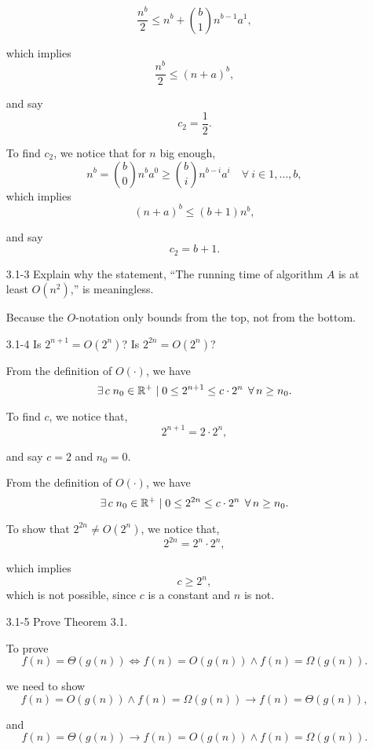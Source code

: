 \begin{enumerate}
\begin{framed}
\[
\frac{n^b}{2} \le n^b + \binom{b}{1} n^{b - 1} a^1,
\]

which implies
\[
\frac{n^b}{2} \le (n + a)^b,
\]

and say
\[
c_2 = \frac{1}{2}.
\]

To find \(c_2\), we notice that for $n$ big enough,
\[
n^b = \binom{b}{0} n^b a^0
\geq \binom{b}{i} n^{b - i} a^i \quad \forall\ i \in 1, \dots ,b,
\]
which implies
\[
(n + a)^b \leq (b + 1) n^b,
\]

and say
\[
c_2 = b + 1.
\]
\end{framed}

\item[3.1{-}3]{Explain why the statement, ``The running time of algorithm $A$ is
  at least $O(n^2)$,'' is meaningless.}

\begin{framed}
Because the $O$-notation only bounds from the top, not from the bottom.
\end{framed}

\item[3.1{-}4]{Is $2^{n+1} = O(2^n)$? Is $2^{2n} = O(2^n)$?}

\begin{framed}
From the definition of $O(\cdot)$, we have
\[
\operatorname{\exists} c\;n_0\in\mathbb{R}^+ \mid 0 \leq 2^{n+1} \leq c \cdot 2^n\;
\operatorname{\forall} n \ge n_0.
\]

To find $c$, we notice that,
\[
2^{n+1} = 2 \cdot 2^n,
\]

and say $c = 2$ and $n_0 = 0$.

From the definition of $O(\cdot)$, we have
\[
\operatorname{\exists} c\;n_0\in\mathbb{R}^+ \mid 0 \leq 2^{2n} \leq c \cdot 2^n\;
\operatorname{\forall} n \ge n_0.
\]

To show that $2^{2n} \neq O(2^n)$, we notice that,
\[
2^{2n} = 2^n \cdot 2^n,
\]

which implies
\[
c \ge 2^n,
\]
which is not possible, since $c$ is a constant and $n$ is not.
\end{framed}

\item[3.1{-}5]{Prove Theorem 3.1.}

\begin{framed}
To prove
\[
f(n) = \Theta(g(n)) \iff f(n) = O(g(n)) \wedge f(n) = \Omega(g(n)).
\]

we need to show
\[
f(n) = O(g(n)) \wedge f(n) = \Omega(g(n)) \rightarrow f(n) = \Theta(g(n)),
\]

and
\[
f(n) = \Theta(g(n)) \rightarrow f(n) = O(g(n)) \wedge f(n) = \Omega(g(n)).
\]


\end{framed}
\end{enumerate}
